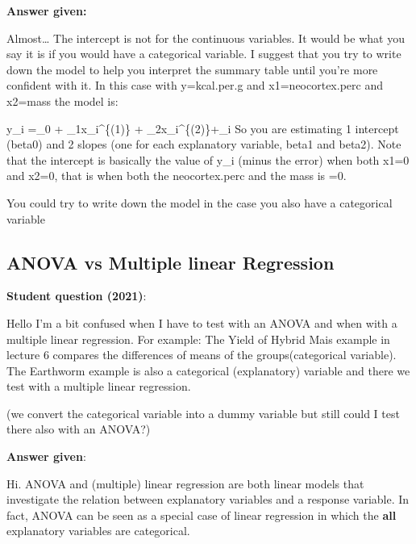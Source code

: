 \documentclass[
  letterpaper,
  8pt,
  a4paper]{book}
\begin{document}
\textbf{Answer given:}

Almost\ldots{} The intercept is not for the continuous variables. It
would be what you say it is if you would have a categorical variable. I
suggest that you try to write down the model to help you interpret the
summary table until you're more confident with it. In this case with
y=kcal.per.g and x1=neocortex.perc and x2=mass the model is:

y\_i =\beta\_0 + \beta\_1x\_i\^{}\{(1)\} +
\beta\_2x\_i\^{}\{(2)\}+\epsilon\_i So you are estimating 1 intercept
(beta0) and 2 slopes (one for each explanatory variable, beta1 and
beta2). Note that the intercept is basically the value of y\_i (minus
the error) when both x1=0 and x2=0, that is when both the neocortex.perc
and the mass is =0.

You could try to write down the model in the case you also have a
categorical variable

\subsection*{ANOVA vs Multiple linear
Regression}\label{anova-vs-multiple-linear-regression}

\textbf{Student question (2021)}:

Hello I'm a bit confused when I have to test with an ANOVA and when with
a multiple linear regression. For example: The Yield of Hybrid Mais
example in lecture 6 compares the differences of means of the
groups(categorical variable). The Earthworm example is also a
categorical (explanatory) variable and there we test with a multiple
linear regression.

(we convert the categorical variable into a dummy variable but still
could I test there also with an ANOVA?)

\textbf{Answer given}:

Hi. ANOVA and (multiple) linear regression are both linear models that
investigate the relation between explanatory variables and a response
variable. In fact, ANOVA can be seen as a special case of linear
regression in which the \textbf{all} explanatory variables are
categorical.
\end{document}
